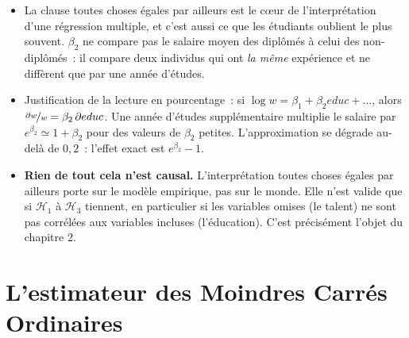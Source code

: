 \documentclass[10pt]{beamer}
\begin{document}
\begin{notes}

  \begin{itemize}

  \item La clause \guillemotleft toutes choses égales par ailleurs \guillemotright{} est
    le c\oe ur de l'interprétation d'une régression multiple, et c'est aussi ce que les
    étudiants oublient le plus souvent. $\beta_2$ ne compare pas le salaire moyen des
    diplômés à celui des non-diplômés~: il compare deux individus qui ont \emph{la même}
    expérience et ne diffèrent que par une année d'études.\newline

  \item Justification de la lecture en pourcentage~: si $\log w = \beta_1 + \beta_2 educ
    + \dots$, alors $\nicefrac{\partial w}{w} = \beta_2\, \partial educ$. Une année
    d'études supplémentaire multiplie le salaire par $e^{\beta_2}\simeq 1+\beta_2$ pour
    des valeurs de $\beta_2$ petites. L'approximation se dégrade au-delà de $0{,}2$~:
    l'effet exact est $e^{\beta_2}-1$.\newline

  \item \textbf{Rien de tout cela n'est causal.} L'interprétation \guillemotleft toutes
    choses égales par ailleurs \guillemotright{} porte sur le modèle empirique, pas sur
    le monde. Elle n'est valide que si $\mathcal H_1$ à $\mathcal H_3$ tiennent, en
    particulier si les variables omises (le talent) ne sont pas corrélées aux variables
    incluses (l'éducation). C'est précisément l'objet du chapitre 2.

  \end{itemize}

\end{notes}


\section{L'estimateur des Moindres Carrés Ordinaires}
\end{document}
